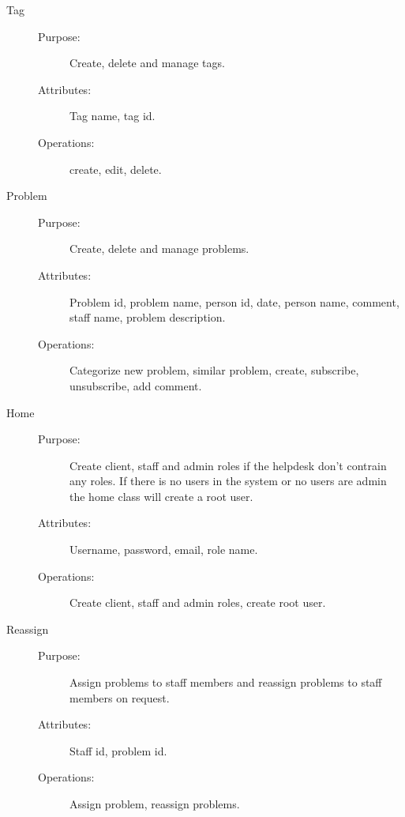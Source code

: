 \begin{description}
\item[Tag]\hfill
\begin{description}
\item[Purpose:]Create, delete and manage tags.
\item[Attributes:]Tag name, tag id.
\item[Operations:]create, edit, delete.
\end{description}
\end{description}

\begin{description}
\item[Problem]\hfill
\begin{description}
\item[Purpose:]Create, delete and manage problems.
\item[Attributes:]Problem id, problem name, person id, date, person name, comment, staff name, problem description.
\item[Operations:]Categorize new problem, similar problem, create, subscribe, unsubscribe, add comment.
\end{description}
\end{description}

\begin{description}
\item[Home]\hfill
\begin{description}
\item[Purpose:]Create client, staff and admin roles if the helpdesk don't contrain any roles. If there is no users in the system or no users are admin the home class will create a root user.
\item[Attributes:]Username, password, email, role name.
\item[Operations:]Create client, staff and admin roles, create root user.
\end{description}
\end{description}

\begin{description}
\item[Reassign]\hfill
\begin{description}
\item[Purpose:]Assign problems to staff members and reassign problems to staff members on request.
\item[Attributes:]Staff id, problem id.
\item[Operations:]Assign problem, reassign problems.
\end{description}
\end{description}


